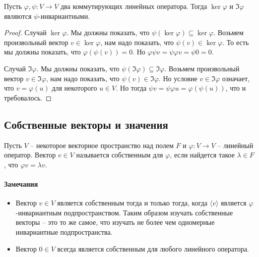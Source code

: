 \begin{claim}
\label{claim::KerImInvar}
Пусть $\varphi,\psi\colon V\to V$ два коммутирующих линейных оператора.
Тогда $\ker \varphi$ и $\Im\varphi$ являются $\psi$-инвариантными.
\end{claim}
\begin{proof}
Случай $\ker \varphi$.
Мы должны показать, что $\psi(\ker\varphi) \subseteq \ker \varphi$.
Возьмем произвольный вектор $v\in \ker\varphi$, нам надо показать, что $\psi(v) \in \ker \varphi$.
То есть мы должны показать, что $\varphi(\psi(v)) = 0$.
Но $\varphi \psi v = \psi \varphi v = \psi 0 = 0$.

Случай $\Im \varphi$.
Мы должны показать, что $\psi(\Im \varphi) \subseteq \Im \varphi$.
Возьмем произвольный вектор $v\in \Im\varphi$, нам надо показать, что $\psi(v) \in \Im\varphi$.
Но условие $v\in \Im \varphi$ означает, что $v = \varphi (u)$ для некоторого $u\in V$.
Но тогда $\psi v = \psi \varphi u = \varphi (\psi(u))$, что и требовалось.
\end{proof}

\subsection{Собственные векторы и значения}

\begin{definition}
Пусть $V$ -- некоторое векторное пространство над полем $F$ и $\varphi \colon V\to V$ -- линейный оператор.
Вектор $v\in V$ называется собственным для $\varphi$, если найдется такое $\lambda \in F$, что $\varphi v = \lambda v$.
\end{definition}

\paragraph{Замечания}

\begin{itemize}

\item Вектор $v\in V$ является собственным тогда и только тогда, когда $\langle v \rangle$ является $\varphi$-инвариантным подпространством.
Таким образом изучать собственные векторы -- это то же самое, что изучать не более чем одномерные инвариантные подпространства.

\item Вектор $0\in V$ всегда является собственным для любого линейного оператора.
\end{itemize}

